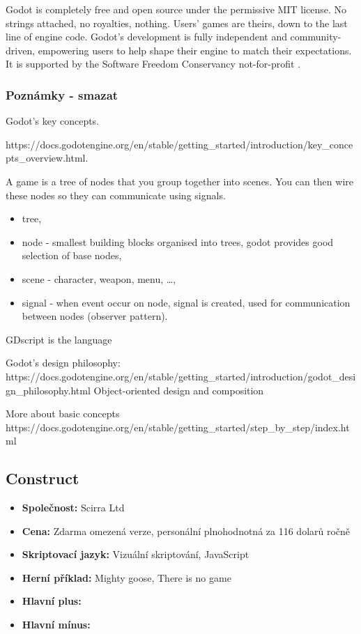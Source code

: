 Godot is completely free and open source under the permissive MIT license. No strings attached, no royalties, nothing. Users' games are theirs, down to the last line of engine code. Godot's development is fully independent and community-driven, empowering users to help shape their engine to match their expectations. It is supported by the Software Freedom Conservancy not-for-profit \cite{godot_introduction} .

\subsubsection{Poznámky - smazat}
Godot's key concepts.

https://docs.godotengine.org/en/stable/getting\_started/introduction/key\_concepts\_overview.html.

A game is a tree of nodes that you group together into scenes. You can then wire these nodes so they can communicate using signals.

\begin{itemize}
	\item tree,
	\item node - smallest building blocks organised into trees, godot provides good selection of base nodes,
	\item scene - character, weapon, menu, \ldots,
	\item  signal - when event occur on node, signal is created, used for communication between nodes (observer pattern).
\end{itemize}




GDscript is the language

Godot's design philosophy:
https://docs.godotengine.org/en/stable/getting\_started/introduction/godot\_design\_philosophy.html
Object-oriented design and composition

More about basic concepts
https://docs.godotengine.org/en/stable/getting\_started/step\_by\_step/index.html

\subsection{Construct}

\begin{itemize}
	\item \textbf{Společnost: } Scirra Ltd
	\item \textbf{Cena: } Zdarma omezená verze, personální plnohodnotná za 116 dolarů ročně
	\item \textbf{Skriptovací jazyk: }  Vizuální skriptování, JavaScript
	\item \textbf{Herní příklad: } Mighty goose, There is no game
	\item \textbf{Hlavní plus: }
	\item \textbf{Hlavní mínus: }
\end{itemize}

